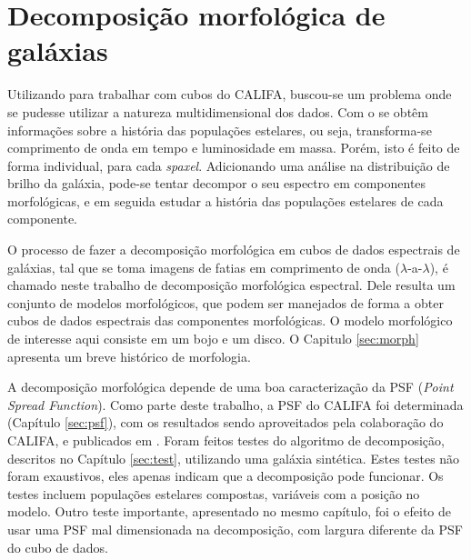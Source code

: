 
\section{Decomposição morfológica de galáxias}

Utilizando \pycasso para trabalhar com cubos do CALIFA, buscou-se um problema
onde se pudesse utilizar a natureza multidimensional dos dados. Com o \starlight
se obtêm informações sobre a história das populações estelares, ou seja,
transforma-se comprimento de onda em tempo e luminosidade em massa. Porém, isto
é feito de forma individual, para cada {\em spaxel}. Adicionando uma análise na
distribuição de brilho da galáxia, pode-se tentar decompor o seu espectro em
componentes morfológicas, e em seguida estudar a história das populações
estelares de cada componente.

O processo de fazer a decomposição morfológica em cubos de dados espectrais de
galáxias, tal que se toma imagens de fatias em comprimento de onda
($\lambda$-a-$\lambda$), é chamado neste trabalho de decomposição morfológica
espectral. Dele resulta um conjunto de modelos morfológicos, que podem ser
manejados de forma a obter cubos de dados espectrais das componentes
morfológicas. O modelo morfológico de interesse aqui consiste em um bojo e um
disco. O Capitulo \ref{sec:morph} apresenta um breve histórico de morfologia.


A decomposição morfológica depende de uma boa caracterização da PSF ({\em Point
Spread Function}). Como parte deste trabalho, a PSF do CALIFA foi determinada
(Capítulo \ref{sec:psf}), com os resultados sendo aproveitados pela colaboração
do CALIFA, e publicados em \citet{GarciaBenito2015}. Foram feitos testes do
algoritmo de decomposição, descritos no Capítulo \ref{sec:test}, utilizando uma
galáxia sintética. Estes testes não foram exaustivos, eles apenas indicam que a
decomposição pode funcionar. Os testes incluem populações estelares compostas,
variáveis com a posição no modelo. Outro teste importante, apresentado no mesmo
capítulo, foi o efeito de usar uma PSF mal dimensionada na decomposição, com
largura diferente da PSF do cubo de dados.

